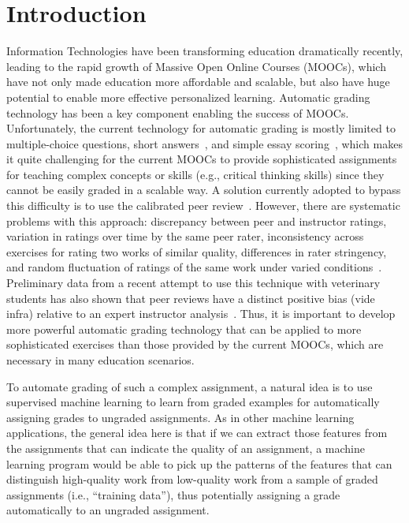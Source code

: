 \def\ignore#1{}
\section{Introduction}

Information Technologies have been transforming education dramatically
recently, leading to the rapid growth of Massive Open Online Courses
(MOOCs), which have not only made education more affordable and scalable,
but also have huge potential to enable more effective personalized
learning.  Automatic grading technology has been a key component enabling
the success of MOOCs. Unfortunately, the
current technology for automatic grading is mostly limited to multiple-choice
questions, short answers~\cite{Brooks:2014:Powergrading,
Leacock:2003:CatH, Mitchell:2002:ICAA, Pulman:2005:EdAppsNLP,
Mohler:2009:EACL}, and simple essay scoring~\cite{Chen:2014:IRRODL,
Balfour:2013}, which makes it quite challenging for the current MOOCs to
provide sophisticated assignments for teaching complex concepts or skills
(e.g., critical thinking skills) since they cannot be easily graded in a
scalable way. A solution currently adopted to bypass this difficulty is to
use the calibrated peer review~\cite{Balfour:2013, Chen:2014:IRRODL,
Sandeen:2013, Suen:2014}.  However, there are systematic problems with this
approach: discrepancy between peer and instructor ratings, variation in
ratings over time by the same peer rater, inconsistency across exercises
for rating two works of similar quality, differences in rater stringency,
and random fluctuation of ratings of the same work under varied
conditions~\cite{Suen:2014}. Preliminary data from a recent attempt to use
this technique with veterinary students has also shown that peer reviews
have a distinct positive bias (vide infra) relative to an expert instructor
analysis~\cite{Ferguson:2014}. Thus, it is important to develop more
powerful automatic grading technology that can be applied to more
sophisticated exercises than those provided by the current MOOCs, which are
necessary in many education scenarios.

To automate grading of such a complex assignment, a natural idea is to use
supervised machine learning to learn from graded examples for automatically
assigning grades to ungraded assignments. As in other machine learning
applications, the general idea here is that if we can extract those
features from the assignments that can indicate the quality of an
assignment, a machine learning program would be able to pick up the
patterns of the features that can distinguish high-quality work from
low-quality work from a sample of graded assignments (i.e., ``training
data''), thus potentially assigning a grade automatically to an ungraded
assignment.

